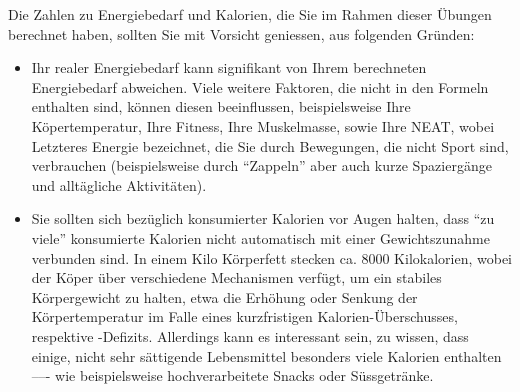 \begin{mycaution}
	Die Zahlen zu Energiebedarf und Kalorien, die Sie im Rahmen dieser Übungen berechnet haben, sollten Sie mit Vorsicht geniessen, aus folgenden Gründen:
	\begin{itemize}
		\item Ihr realer Energiebedarf kann signifikant von Ihrem berechneten Energiebedarf abweichen. Viele weitere Faktoren, die nicht in den Formeln enthalten sind, können diesen beeinflussen, beispielsweise Ihre Köpertemperatur, Ihre Fitness, Ihre Muskelmasse, sowie Ihre \gls{NEAT}, wobei Letzteres Energie bezeichnet, die Sie durch Bewegungen, die nicht Sport sind, verbrauchen (beispielsweise durch ``Zappeln'' aber auch kurze Spaziergänge und alltägliche Aktivitäten).
		\item Sie sollten sich bezüglich konsumierter Kalorien vor Augen halten, dass ``zu viele'' konsumierte Kalorien nicht automatisch mit einer Gewichtszunahme verbunden sind. In einem Kilo Körperfett stecken ca. 8000 Kilokalorien, wobei der Köper über verschiedene Mechanismen verfügt, um ein stabiles Körpergewicht zu halten, etwa die Erhöhung oder Senkung der Körpertemperatur im Falle eines kurzfristigen Kalorien-Überschusses, respektive -Defizits. Allerdings kann es interessant sein, zu wissen, dass einige, nicht sehr sättigende Lebensmittel besonders viele Kalorien enthalten ––- wie beispielsweise hochverarbeitete Snacks oder Süssgetränke.
	\end{itemize}
\end{mycaution}
